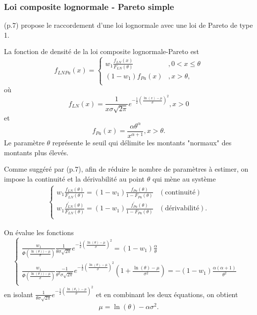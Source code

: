 	\subsubsection{Loi composite lognormale - Pareto simple}
	\cite{brazauskas2016modeling} (p.7) propose le raccordement d'une loi lognormale avec une loi de Pareto de type 1.
	\begin{Definition}
		La fonction de densité de la loi composite lognormale-Pareto est 
		$$
			f_{LNPa}(x) = \left\{
			\begin{array}{ll}
				w_1 \frac{f_{LN}(x)}{F_{LN}(\theta)} & ,0 < x \leq \theta \\
				(1-w_1) {f_{Pa}(x)}& , x >\theta, \\
			\end{array}
			\right.
		$$
		où $$ f_{LN}(x)= \frac{1}{x \sigma \sqrt{2 \pi}} e^{-\frac{1}{2} \left( \frac{\ln(x)- \mu}{\sigma} \right)^2}, x>0 $$ et $$f_{Pa}(x)= \frac{\alpha \theta^{\alpha}}{x^{\alpha+1}}, x>\theta. $$
		Le paramètre $\theta$ représente le seuil qui délimite les montants "normaux" des montants plus élevés.
	\end{Definition}
		Comme suggéré par \cite{brazauskas2016modeling} (p.7), afin de réduire le nombre de paramètres à estimer, on impose la continuité et la dérivabilité au point $\theta$ qui mène au système
		\begin{align}\label{continuite_LN-Pa}
			\left\{
			\begin{array}{ll}
				w_1 \frac{f_{LN}(\theta)}{F_{LN}(\theta)} = (1-w_1) \frac{f_{Pa}(\theta)}{1-F_{Pa}(\theta)} & (\textrm{continuité}) \\
				w_1 \frac{f_{LN}^{'}(\theta)}{F_{LN}(\theta)} = (1-w_1) \frac{f_{Pa}^{'}(\theta)}{1-F_{Pa}(\theta)} & (\textrm{dérivabilité}). \\
			\end{array}
			\right.
		\end{align}
		
		On évalue les fonctions
		$$
		\left\{
		\begin{array}{ll}
			 \frac{w_1}{\Phi \left( \frac{\ln(\theta))- \mu}{\sigma} \right)}
			 \frac{1}{\theta \sigma \sqrt{2 \pi}} e^{-\frac{1}{2} \left( \frac{\ln(\theta)- \mu}{\sigma} \right)^2}
			 = (1-w_1) \frac{\alpha}{\theta} &  \\
			\frac{w_1}{\Phi \left( \frac{\ln(\theta))- \mu}{\sigma} \right)}
			\frac{-1}{\theta^2 \sigma \sqrt{2 \pi}} e^{-\frac{1}{2} \left( \frac{\ln(\theta)- \mu}{\sigma} \right)^2}
			(1+\frac{\ln(\theta) -\mu}{\sigma^2})
			= -(1-w_1)  \frac{\alpha (\alpha +1)}{\theta^2} & \\
		\end{array}
		\right.
		$$
		en isolant $\frac{1}{\theta \sigma \sqrt{2 \pi}} e^{-\frac{1}{2} \left( \frac{\ln(\theta_1)- \mu}{\sigma} \right)^2}$ et en combinant les deux équations, on obtient
		\begin{align}
			\mu = \ln (\theta) - \alpha \sigma^2.\label{mu_LN-Pa}
		\end{align}
		
